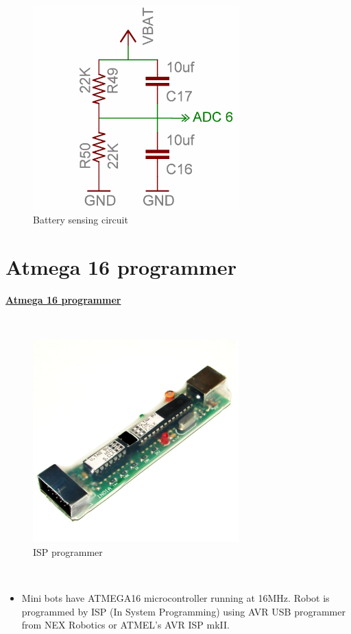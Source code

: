 \documentclass[a4paper,12pt,oneside]{book}
\begin{document}
	\hfill\\
	\begin{figure}[h!]
		\includegraphics[width=300px]{./HardwareManual/battery_voltage_sensor.png}
		\caption{Battery sensing circuit}
	\end{figure}	
	
	\chapter[Atmega 16 programmer]{Atmega 16 programmer}
	\underline{\textbf{\Large{Atmega 16 programmer}}}
	
	\hfill\\
	\begin{figure}[h!]
		\centering\includegraphics[width=300px]{./HardwareManual/ISP_programmer.png}
		\caption{ISP programmer}
	\end{figure}	
	\hfill\\
	
	\begin{itemize}
	\item{Mini bots have ATMEGA16 microcontroller running at 16MHz. Robot is programmed by ISP (In System Programming) using AVR USB programmer from NEX
		Robotics or ATMEL’s AVR ISP mkII.}
	\end{itemize}
	
\end{document}
